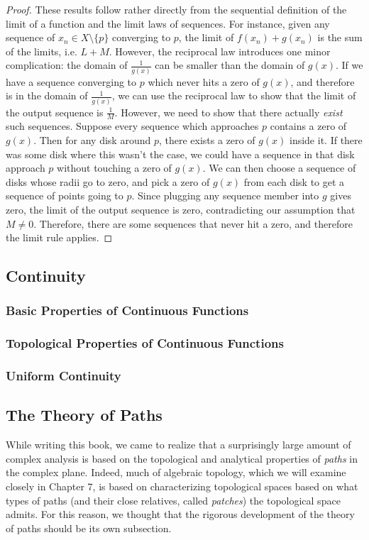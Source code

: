 \begin{proof}
These results follow rather directly from the sequential definition of the limit of a function and the limit laws of sequences. For instance, given any sequence of $x_n \in X\setminus\{p\}$ converging to $p$, the limit of $f(x_n)+g(x_n)$ is the sum of the limits, i.e. $L+M$. However, the reciprocal law introduces one minor complication: the domain of $\frac{1}{g(x)}$ can be smaller than the domain of $g(x)$. If we have a sequence converging to $p$ which never hits a zero of $g(x)$, and therefore is in the domain of $\frac{1}{g(x)}$, we can use the reciprocal law to show that the limit of the output sequence is $\frac{1}{M}$. However, we need to show that there actually \emph{exist} such sequences. Suppose every sequence which approaches $p$ contains a zero of $g(x)$. Then for any disk around $p$, there exists a zero of $g(x)$ inside it. If there was some disk where this wasn't the case, we could have a sequence in that disk approach $p$ without touching a zero of $g(x)$. We can then choose a sequence of disks whose radii go to zero, and pick a zero of $g(x)$ from each disk to get a sequence of points going to $p$. Since plugging any sequence member into $g$ gives zero, the limit of the output sequence is zero, contradicting our assumption that $M \neq 0$. Therefore, there are some sequences that never hit a zero, and therefore the limit rule applies.
\end{proof}
\subsection{Continuity}
\subsubsection{Basic Properties of Continuous Functions}
\subsubsection{Topological Properties of Continuous Functions}
\subsubsection{Uniform Continuity}
\subsection{The Theory of Paths}
While writing this book, we came to realize that a surprisingly large amount of complex analysis is based on the topological and analytical properties of \emph{paths} in the complex plane. Indeed, much of algebraic topology, which we will examine closely in Chapter 7, is based on characterizing topological spaces based on what types of paths (and their close relatives, called \emph{patches}) the topological space admits. For this reason, we thought that the rigorous development of the theory of paths should be its own subsection.
